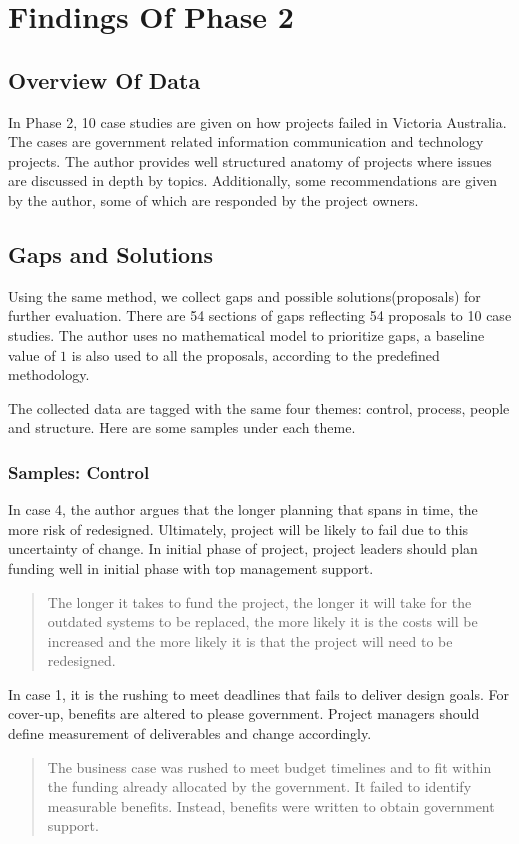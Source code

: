 
\section{Findings Of Phase 2}

\subsection{Overview Of Data}
In Phase 2, 10 case studies are given on how projects failed in Victoria Australia. The cases are government related information communication and technology projects. The author\parencite{case_study} provides well structured anatomy of projects where issues are discussed in depth by topics. Additionally, some recommendations are given by the author, some of which are responded by the project owners.

\subsection{Gaps and Solutions}
Using the same method, we collect gaps and possible solutions(proposals) for further evaluation. There are 54 sections of gaps reflecting 54 proposals to 10 case studies. The author uses no mathematical model to prioritize gaps, a baseline value of $1$ is also used to all the proposals, according to the predefined methodology.

The collected data are tagged with the same four themes: control, process, people and structure. Here are some samples under each theme.

\subsubsection{Samples: Control}
In case 4, the author argues that the longer planning that spans in time, the more risk of redesigned. Ultimately, project will be likely to fail due to this uncertainty of change. In initial phase of project, project leaders should plan funding well in initial phase with top management support.
\begin{quotation}
The longer it takes to fund the project, the longer it will take for the outdated systems to be replaced, the more likely it is the costs will be increased and the more likely it is that the project will need to be redesigned.
\end{quotation}


In case 1, it is the rushing to meet deadlines that fails to deliver design goals. For cover-up, benefits are altered to please government. Project managers should define measurement of deliverables and change accordingly. 
\begin{quotation}
The business case was rushed to meet budget timelines and to fit within the funding already allocated by the government. It failed to identify measurable benefits. Instead, benefits were written to obtain government support.
\end{quotation}

